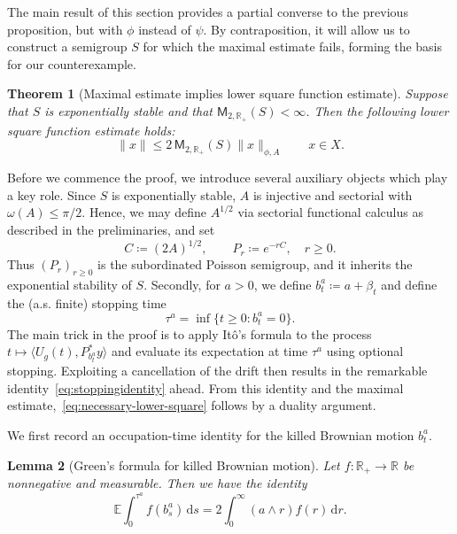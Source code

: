 \documentclass[11pt]{amsart}
\newtheorem{theorem}{Theorem}[section]
\newtheorem{lemma}[theorem]{Lemma}
\theoremstyle{definition}
\theoremstyle{remark}
\numberwithin{equation}{section}
\newcommand{\E}{\mathbb E}
\newcommand{\R}{\mathbb R}
\newcommand{\1}{\mathbf 1}
\newcommand{\cM}{\mathsf{M}}
\newcommand{\norm}[1]{\lVert #1\rVert}
\newcommand{\dd}{\,\mathrm d}
\begin{document}
The main result of this section provides a partial converse to the previous proposition, but with $\phi$ instead of $\psi$.
By contraposition, it will allow us to construct a semigroup $S$ for which the maximal estimate fails, forming the basis for our counterexample.
\begin{theorem}[Maximal estimate implies lower square function estimate]
\label{thm:necessary-square}
Suppose that $S$ is exponentially stable and that $\cM_{2,\R_+}(S) < \infty$.
Then the following lower square function estimate holds:
\begin{equation}
 \norm{x}\leq 2\, \cM_{2,\R_+}(S) \norm{x}_{\phi,A}
 \qquad x\in X.
 \label{eq:necessary-lower-square}
\end{equation}
\end{theorem}

Before we commence the proof, we introduce several auxiliary objects which play a key role.
Since $S$ is exponentially stable, $A$ is injective and sectorial with $\omega(A) \leq \pi / 2$.
Hence, we may define $A^{1/2}$ via sectorial functional calculus as described in the preliminaries, and set
\[
 C\coloneq (2A)^{1/2}, \qquad P_r\coloneq e^{-rC},\quad r\geq 0.
\]
Thus \((P_r)_{r \geq 0}\) is the subordinated Poisson semigroup, and it inherits the exponential stability of $S$.
Secondly, for $a > 0$, we define $b^a_t \coloneq a + \beta_t$ and define the (a.s. finite) stopping time
\[
 \tau^a=\inf\{t\geq0:b^a_t = 0\}.
\]
The main trick in the proof is to apply It\^o's formula to the process $t \mapsto \langle U_g(t), P^*_{b^a_t}y\rangle$ and evaluate its expectation at time $\tau^a$ using optional stopping.
Exploiting a cancellation of the drift then results in the remarkable identity~\eqref{eq:stoppingidentity} ahead.
From this identity and the maximal estimate,~\eqref{eq:necessary-lower-square} follows by a duality argument.

We first record an occupation-time identity for the killed Brownian motion $b^a_t$.
\begin{lemma}[Green's formula for killed Brownian motion]
\label{lem:green-killed-bm}
Let $f : \R_+ \to \R$ be nonnegative and measurable. Then we have the identity
\begin{equation}
\label{eq:green-killed-bm}
    \E\int_0^{\tau^a}f(b^a_s)\dd s
    =
    2\int_0^\infty (a\wedge r)f(r)\dd r.
\end{equation}

\end{lemma}
\end{document}
